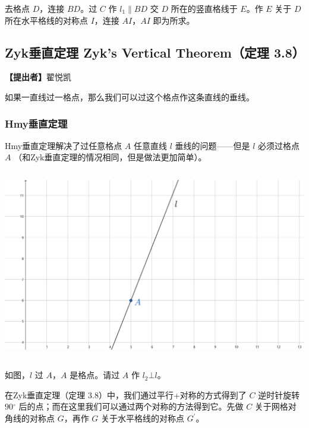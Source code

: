 \documentclass[UTF8]{article}
\begin{document}
去格点 \(D\)，连接 \(BD\)。过 \(C\) 作 \(l_{1} \parallel BD\) 交 \(D\)
所在的竖直格线于 \(E\)。作 \(E\) 关于 \(D\) 所在水平格线的对称点
\(I\)，连接 \(AI\)，\(AI\) 即为所求。

\hypertarget{zykux5782ux76f4ux5b9aux7406-zyks-vertical-theoremux5b9aux7406-3.8}{%
\subsection{Zyk垂直定理 Zyk's Vertical Theorem（定理
3.8）}\label{zykux5782ux76f4ux5b9aux7406-zyks-vertical-theoremux5b9aux7406-3.8}}

\textbf{【提出者】}翟悦凯

如果一直线过一格点，那么我们可以过这个格点作这条直线的垂线。

\hypertarget{hmyux5782ux76f4ux5b9aux7406}{%
\subsubsection{Hmy垂直定理}\label{hmyux5782ux76f4ux5b9aux7406}}

Hmy垂直定理解决了过任意格点 \(A\) 任意直线 \(l\) 垂线的问题------但是
\(l\) 必须过格点 \(A\) （和Zyk垂直定理的情况相同，但是做法更加简单）。

\includegraphics[width=5.76806in,height=3.27847in]{media/image44.png}

如图，\(l\) 过 \(A\)，\(A\) 是格点。请过 \(A\) 作 \(l_{2}\bot l\)。

在Zyk垂直定理（定理 3.8）中，我们通过平行+对称的方式得到了 \(C\)
逆时针旋转 \(90{^\circ}\)
后的点；而在这里我们可以通过两个对称的方法得到它。先做 \(C\)
关于网格对角线的对称点 \(G\)，再作 \(G\) 关于水平格线的对称点
\(G^{'}\)。
\end{document}
